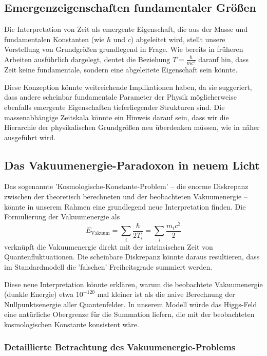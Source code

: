 \documentclass[a4paper,12pt]{article}
\begin{document}
	\subsection{Emergenzeigenschaften fundamentaler Größen}
	
	Die Interpretation von Zeit als emergente Eigenschaft, die aus der Masse und fundamentalen Konstanten (wie $\hbar$ und $c$) abgeleitet wird, stellt unsere Vorstellung von Grundgrößen grundlegend in Frage. Wie bereits in früheren Arbeiten \cite{pascher_zeit_2025, pascher_natur_2025} ausführlich dargelegt, deutet die Beziehung $T = \frac{\hbar}{mc^2}$ darauf hin, dass Zeit keine fundamentale, sondern eine abgeleitete Eigenschaft sein könnte. 
	
	Diese Konzeption könnte weitreichende Implikationen haben, da sie suggeriert, dass andere scheinbar fundamentale Parameter der Physik möglicherweise ebenfalls emergente Eigenschaften tieferliegender Strukturen sind. Die massenabhängige Zeitskala könnte ein Hinweis darauf sein, dass wir die Hierarchie der physikalischen Grundgrößen neu überdenken müssen, wie in \cite{pascher_kompl_2025} näher ausgeführt wird.
	
	\subsection{Das Vakuumenergie-Paradoxon in neuem Licht}
	
	Das sogenannte 'Kosmologische-Konstante-Problem' – die enorme Diskrepanz zwischen der theoretisch berechneten und der beobachteten Vakuumenergie – könnte in unserem Rahmen eine grundlegend neue Interpretation finden. Die Formulierung der Vakuumenergie als 
	\begin{equation}
		E_{\text{Vakuum}} = \sum_i \frac{\hbar}{2T_i} = \sum_i \frac{m_i c^2}{2}
	\end{equation}
	verknüpft die Vakuumenergie direkt mit der intrinsischen Zeit von Quantenfluktuationen. Die scheinbare Diskrepanz könnte daraus resultieren, dass im Standardmodell die 'falschen' Freiheitsgrade summiert werden.
	
	Diese neue Interpretation könnte erklären, warum die beobachtete Vakuumenergie (dunkle Energie) etwa $10^{-120}$ mal kleiner ist als die naive Berechnung der Nullpunktsenergie aller Quantenfelder. In unserem Modell würde das Higgs-Feld eine natürliche Obergrenze für die Summation liefern, die mit der beobachteten kosmologischen Konstante konsistent wäre.
	
	\subsubsection{Detaillierte Betrachtung des Vakuumenergie-Problems}
	
\end{document}
